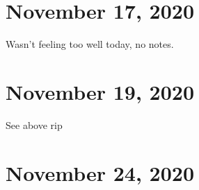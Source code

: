 \section{November 17, 2020}
Wasn't feeling too well today, no notes.
\section{November 19, 2020}
See above rip
\section{November 24, 2020}
